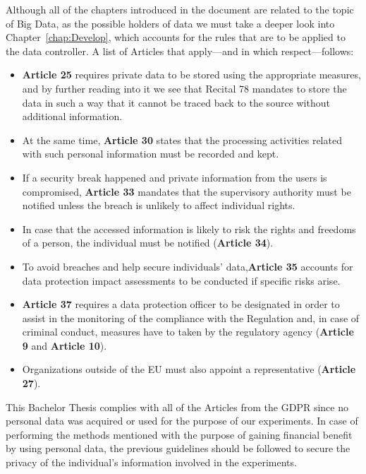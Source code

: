 Although all of the chapters introduced in the document are related to the topic of Big Data, as the possible holders of data we must take a deeper look into Chapter~\ref{chap:Develop}, which accounts for the rules that are to be applied to the data controller. 
%
A list  of Articles that apply---and in which respect---follows:
%
\begin{itemize}
	\item \textbf{Article 25} requires private data to be stored using the appropriate measures, and by further reading into it we see that Recital 78 mandates to store the data in such a way that it cannot be traced back to the source without additional information.
	
	\item At the same time, \textbf{Article 30} states that the processing activities related with such personal information must be recorded and kept. 
	
	\item  If a security break happened and private information from the users is compromised, \textbf{Article 33} mandates that the supervisory authority must be notified unless the breach is unlikely to affect individual rights. 
	
	\item In case that the accessed information is likely to risk the rights and freedoms of a person, the individual must be notified (\textbf{Article 34}).
	
	\item To avoid breaches and help secure individuals' data,\textbf{Article 35} accounts for data protection impact assessments to be conducted if specific risks arise.
	
	\item \textbf{Article 37} requires a data protection officer to be designated in order to assist in the monitoring of the compliance with the Regulation and, in case of criminal conduct, measures have to taken by the regulatory agency (\textbf{Article 9} and \textbf{Article 10}).
	
	\item  Organizations outside of the EU must also appoint a representative (\textbf{Article 27}).
	
\end{itemize}  

This Bachelor Thesis complies with all of the Articles from the GDPR since no personal data was acquired or used for the purpose of our experiments. In case of performing the methods mentioned with the purpose of gaining financial benefit by using personal data, the previous guidelines should be followed to secure the privacy of the individual's information involved in the experiments. \par



